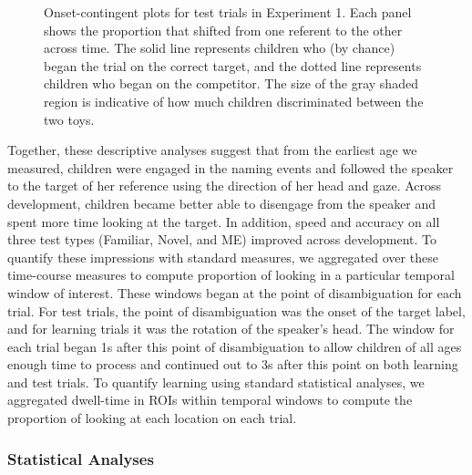 \documentclass[man,floatsintext]{apa6}
\begin{document}
\begin{figure}[tb]
	\caption{\label{fig:exp1_split} Onset-contingent plots for test trials in Experiment 1. Each panel shows the proportion that shifted from one referent to the other across time. The solid line represents children who (by chance) began the trial on the correct target, and the dotted line represents children who began on the competitor. The size of the gray shaded region is indicative of how much children discriminated between the two toys.}
\end{figure}

Together, these descriptive analyses suggest that from the earliest age we measured, children were engaged in the naming events and followed the speaker to the target of her reference using the direction of her head and gaze. Across development, children became better able to disengage from the speaker and spent more time looking at the target. In addition, speed and accuracy on all three test types (Familiar, Novel, and ME) improved across development. To quantify these impressions with standard measures, we aggregated over these time-course measures to compute proportion of looking in a particular temporal window of interest. These windows began at the point of disambiguation for each trial. For test trials, the point of disambiguation was the onset of the target label, and for learning trials it was the rotation of the speaker's head. The window for each trial began 1s after this point of disambiguation to allow children of all ages enough time to process and continued out to 3s after this point on both learning and test trials. To quantify learning using standard statistical analyses, we aggregated dwell-time in ROIs within temporal windows to compute the proportion of looking at each location on each trial.

\subsubsection{Statistical Analyses}
\end{document}
